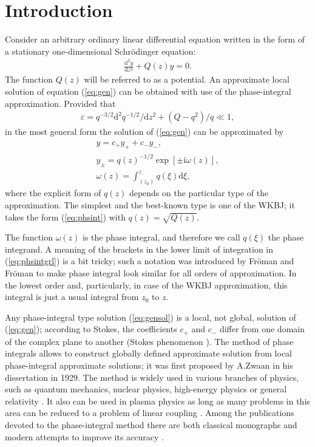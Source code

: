\documentclass{ws-m3as}
\def\rmi{\mathrm{i}}
\def\rmd{\mathrm{d}}
\def\w{\omega}
\newcommand\eref[1]{(\ref{#1})}
\newcommand\phsintgrnd[1][z]{q(#1)}
\newcommand\predexp[1][z]{q(#1)^{-1/2}}
\newcommand\phsintgrl[3][z]{\int_{#2}^{#3} \phsintgrnd[#1] \rmd #1}
\begin{document}
\section{Introduction \label{sec:intro}}
Consider an arbitrary ordinary linear differential equation written in the form of 
a stationary one-dimensional Schr\"odinger equation:
\begin{eqnarray}
\frac{\rmd^2 y}{\rmd z^2} + Q(z)y = 0.   \label{eq:gen}
\end{eqnarray}
The function $Q(z)$ will be referred to as a potential. An approximate local solution 
of equation \eref{eq:gen} can be obtained with use of the phase-integral approximation\cite{frbook}. 
Provided that 
\begin{eqnarray}
\varepsilon = q^{-3/2} \rmd^2 q^{-1/2}/\rmd z^2  + (Q - q^2)/q \ll 1,   \label{eq:cond}
\end{eqnarray}
in the most general form the solution of \eref{eq:gen} can be approximated by
\begin{subequations}
\begin{eqnarray}
y = c_+y_+ + c_-y_-, \label{eq:gensol}
\\
y_\pm = \predexp \exp [\pm \rmi \w(z)], \label{eq:phsint}
\\
\w(z)=\phsintgrl[\xi]{(z_0)}{z}, \label{eq:phsintgrl}
\end{eqnarray}
\end{subequations}
where the explicit form of $q(z)$ depends on the particular type of the approximation.
The simplest and the best-known type is one of the WKBJ\cite{wkb1,wkb2,wkb3,wkbj}; 
it takes the form \eref{eq:phsint} with $\phsintgrnd = \sqrt{Q(z)}$.

The function $\w(z)$ is the phase integral, and therefore we call $\phsintgrnd[\xi]$ 
the phase integrand. A meaning of the brackets in the lower limit of integration in \eref{eq:phsintgrl}
is a bit tricky; such a notation was introduced by Fr\"oman and Fr\"oman\cite{frpaper} to make
phase integral look similar for all orders of approximation. In the lowest order and, particularly,
in case of the WKBJ approximation, this integral is just a usual integral from $z_0$ to $z$. 

Any phase-integral type solution \eref{eq:gensol} is a local, not global, 
solution of \eref{eq:gen}; according to Stokes\cite{stokes}, the coefficients $c_+$ and $c_-$
differ from one domain of the complex plane to another (Stokes phenomenon \cite{frbook,stokes,heading,rwbook}). 
The method of phase integrals allows to construct globally 
defined approximate solution from local phase-integral approximate solutions; 
it was first proposed by A.Zwaan\cite{zwaan} in his dissertation in 1929. 
The method is widely used in various branches of physics, such as 
quantum mechanics\cite{serg96,serg02,esp09},  
nuclear physics\cite{aleixo00}, high-energy physics \cite{poor16} or general relativity \cite{ander92,manor77,rojas07}.
It also can be used in plasma physics as long as many problems 
in this area can be reduced to a problem of linear coupling \cite{shal08,shal10,shal12}.
Among the publications devoted to the phase-integral method there are both 
classical monographs \cite{frbook,heading,rwbook,dingle73,berry91} 
and modern attempts to improve its accuracy \cite{ours,delabaere97}.
\end{document}
